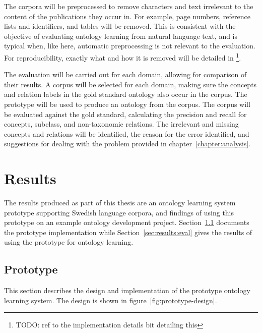 \documentclass[a4paper]{report}
\newcommand{\todo}[1]{\footnote{{\color{red} TODO: #1}}}
\begin{document}
The corpora will be preprocessed to remove characters and text irrelevant to the content of the publications they occur in.
For example, page numbers, reference lists and identifiers, and tables will be removed.
This is consistent with the objective of evaluating ontology learning from natural language text, and is typical when, like here, automatic preprocessing is not relevant to the evaluation.
For reproducibility, exactly what and how it is removed will be detailed in \todo{ref to the implementation details bit detailing this}.

The evaluation will be carried out for each domain, allowing for comparison of their results.
A corpus will be selected for each domain, making sure the concepts and relation labels in the gold standard ontology also occur in the corpus.
The prototype will be used to produce an ontology from the corpus.
The corpus will be evaluated against the gold standard, calculating the precision and recall for concepts, subclass, and non-taxonomic relations.
The irrelevant and missing concepts and relations will be identified, the reason for the error identified, and suggestions for dealing with the problem provided in chapter~\ref{chapter:analysis}.


\chapter{Results}

The results produced as part of this thesis are an ontology learning system prototype supporting Swedish language corpora, and findings of using this prototype on an example ontology development project.
Section~\ref{sec:results:prototype} documents the prototype implementation while Section~\ref{sec:results:eval} gives the results of using the prototype for ontology learning.

\section{Prototype}
\label{sec:results:prototype}
This section describes the design and implementation of the prototype ontology learning system.
The design is shown in figure~\ref{fig:prototype-design}.
\end{document}
